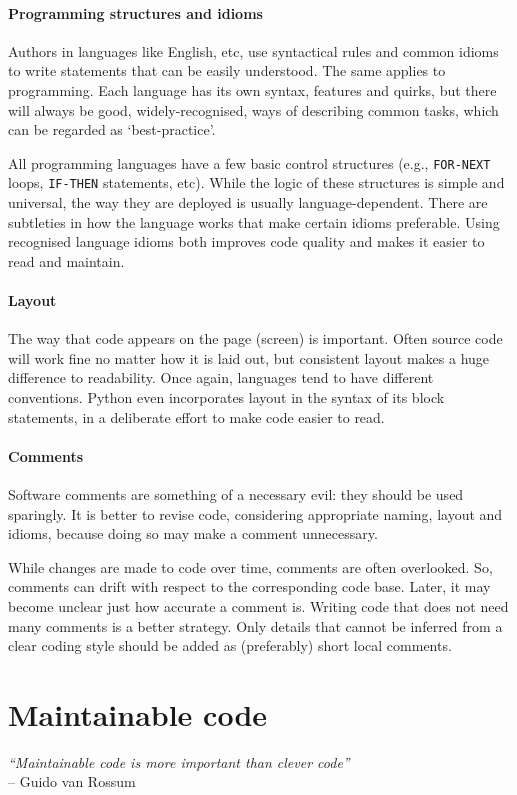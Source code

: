 \paragraph{Programming structures and idioms} Authors in languages like English, etc, use syntactical rules and common idioms to write statements that can be easily understood. The same applies to programming. Each language has its own syntax, features and quirks, but there will always be good, widely-recognised, ways of describing common tasks, which can be regarded as `best-practice'.

All programming languages have a few basic control structures (e.g., \texttt{FOR-NEXT} loops, \texttt{IF-THEN} statements, etc). While the logic of these structures is simple and universal, the way they are deployed is usually language-dependent. There are subtleties in how the language works that make certain idioms preferable. Using recognised language idioms both improves code quality and makes it easier to read and maintain. 

  

\paragraph{Layout} The way that code appears on the page (screen) is important. Often source code will work fine no matter how it is laid out, but consistent layout makes a huge difference to readability. Once again, languages tend to have different conventions. Python even incorporates layout in the syntax of its block statements, in a deliberate effort to make code easier to read.

\paragraph{Comments} Software comments are something of a necessary evil: they should be used sparingly. It is better to revise code, considering appropriate naming, layout and idioms, because doing so may make a comment unnecessary.

While changes are made to code over time, comments are often overlooked. So, comments can drift with respect to the corresponding code base. Later, it may become unclear just how accurate a comment is. Writing code that does not need many comments is a better strategy. Only details that cannot be inferred from a clear coding style should be added as (preferably) short local comments.

\section{Maintainable code}
\begin{flushright}
\textit{``Maintainable code is more important than clever code''} \\
-- Guido van Rossum 
\end{flushright}





